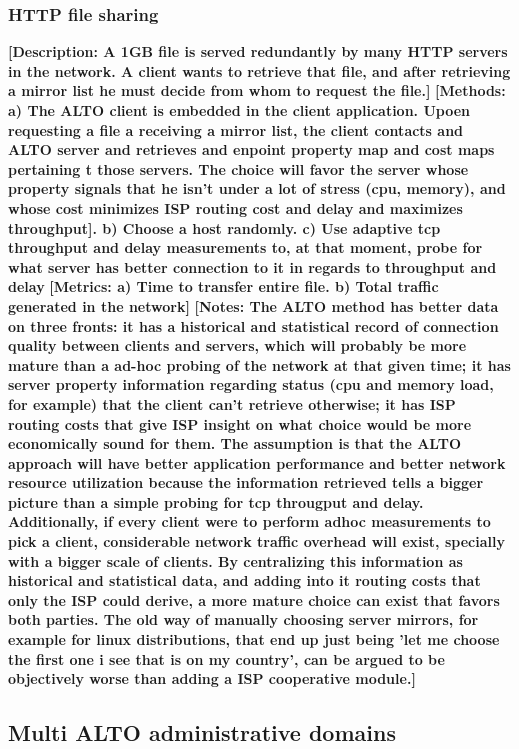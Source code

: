 \subsubsection{HTTP file sharing}
\textbf{[Description: A 1GB file is served redundantly by many HTTP servers in the network. A client wants to retrieve that file, and after retrieving a mirror list he must decide from whom to request the file.]}
\textbf{[Methods: a) The ALTO client is embedded in the client application. Upoen requesting a file a receiving a mirror list, the client contacts and ALTO server and retrieves and enpoint property map and cost maps pertaining t those servers. The choice will favor the server whose property signals that he isn't under a lot of stress (cpu, memory), and whose cost minimizes ISP routing cost and delay and maximizes throughput]. b) Choose a host randomly. c) Use adaptive tcp throughput and delay measurements to, at that moment, probe for what server has better connection to it in regards to throughput and delay}
\textbf{[Metrics: a) Time to transfer entire file. b) Total traffic generated in the network]}
\textbf{[Notes: The ALTO method has better data on three fronts: it has a historical and statistical record of connection quality between clients and servers, which will probably be more mature than a ad-hoc probing of the network at that given time; it has server property information regarding status (cpu and memory load, for example) that the client can't retrieve otherwise; it has ISP routing costs that give ISP insight on what choice would be more economically sound for them. The assumption is that the ALTO approach will have better application performance and better network resource utilization because the information retrieved tells a bigger picture than a simple probing for tcp througput and delay. Additionally, if every client were to perform adhoc measurements to pick a client, considerable network traffic overhead will exist, specially with a bigger scale of clients. By centralizing this information as historical and statistical data, and adding into it routing costs that only the ISP could derive, a more mature choice can exist that favors both parties. The old way of manually choosing server mirrors, for example for linux distributions, that end up just being 'let me choose the first one i see that is on my country', can be argued to be objectively worse than adding a ISP cooperative module.]}


\subsection{Multi ALTO administrative domains}

